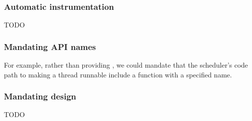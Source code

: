 
\subsubsection{Automatic instrumentation}
TODO

\subsubsection{Mandating API names}
For example, rather than providing , we could mandate that the scheduler's code path to making a thread runnable include a function with a specified name.

\subsubsection{Mandating design}
TODO






